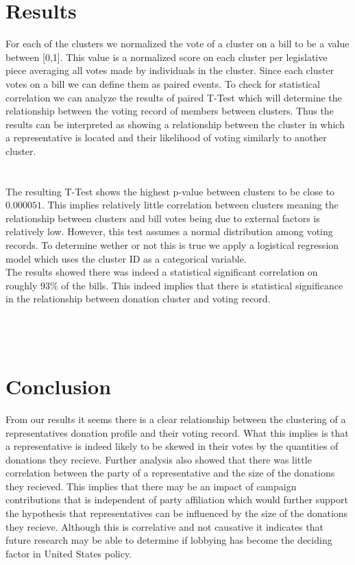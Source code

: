 \documentclass[journal]{IEEEtran}
\begin{document}
\section{Results}
For each of the clusters we normalized the vote of a cluster on a bill to be a value between [0,1]. This value is a normalized score
on each cluster per legislative piece averaging all votes made by individuals in the cluster. Since each cluster votes on a bill we 
can define them as paired events. To check for statistical correlation we can analyze the results of paired T-Test which will 
determine the relationship between the voting record of members between clusters. Thus the results can be interpreted as showing a 
relationship between the cluster in which a representative is located and their likelihood of voting similarly to another cluster.\\
\\\\
The resulting T-Test shows the highest p-value between clusters to be close to $0.000051$. This implies relatively little correlation between
clusters meaning the relationship between clusters and bill votes being due to external factors is relatively low. However, this test 
assumes a normal distribution among voting records. To determine wether or not this is true we apply a logistical regression model which
uses the cluster ID as a categorical variable.\\
The results showed there was indeed a statistical significant correlation on roughly $93\%$ of the bills. This indeed implies that there is 
statistical significance in the relationship between donation cluster and voting record.\\\\
\\\\
\section{Conclusion}
From our results it seems there is a clear relationship between the clustering of a representatives donation profile and their voting
record. What this implies is that a representative is indeed likely to be skewed in their votes by the quantities of donations they recieve.
Further analysis also showed that there was little correlation between the party of a representative and the size of the donations they
recieved. This implies that there may be an impact of campaign contributions that is independent of party affiliation which would further
support the hypothesis that representatives can be influenced by the size of the donations they recieve. Although this is correlative and
not causative it indicates that future research may be able to determine if lobbying has become the deciding factor in United States policy.
\end{document}
